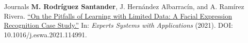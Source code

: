 

\begin{cventries}

  \cventry
    {} %
    {Journals} %
    {} %
    {} %
    {
      \textbf{M. Rodríguez Santander}, J. Hernández Albarracín, and A. Ramírez Rivera. \href{https://www.sciencedirect.com/science/article/pii/S0957417421004322}{“On the Pitfalls of Learning with Limited Data: A Facial Expression Recognition Case Study.”} In: \textit{Experts Systems with Applications} (2021). DOI: 10.1016/j.eswa.2021.114991.
    }

\end{cventries}

